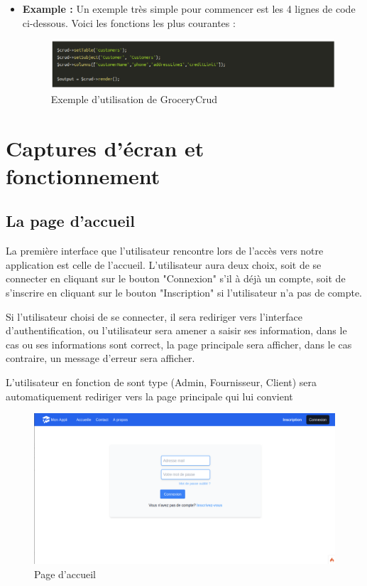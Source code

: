 \documentclass[french]{report}
\begin{document}
\begin{itemize}
    \item \textbf{Example :}
    Un exemple très simple pour commencer est les 4 lignes de code ci-dessous.
    Voici les fonctions les plus courantes :
    \begin{figure}[H]
    \centering
    \includegraphics[width=1\textwidth]{images/example.png}
    \caption{Exemple d'utilisation de GroceryCrud}
    \label{fig:my_label}
\end{figure}
\end{itemize}

\section{Captures d'écran et fonctionnement}

\subsection{La page d'accueil}
    
La première interface que l'utilisateur rencontre lors de l'accès vers notre
application est celle de l'accueil. L'utilisateur aura deux choix, soit de se
connecter en cliquant sur le bouton "Connexion" s'il à déjà un compte, soit de
s'inscrire en cliquant sur le bouton "Inscription" si l'utilisateur n'a pas de
compte.

Si l'utilisateur choisi de se connecter, il sera rediriger vers l'interface
d'authentification, ou l'utilisateur sera amener a saisir ses information, dans
le cas ou ses informations sont correct, la page principale sera afficher, dans
le cas contraire, un message d'erreur sera afficher.

L'utilisateur en fonction de sont type (Admin, Fournisseur, Client) sera
automatiquement rediriger vers la page principale qui lui convient

\begin{figure}[H]
    \centering
    \includegraphics[width=1\textwidth]{images/accueil.png}
    \caption{Page d'accueil}
\end{figure}
\end{document}
